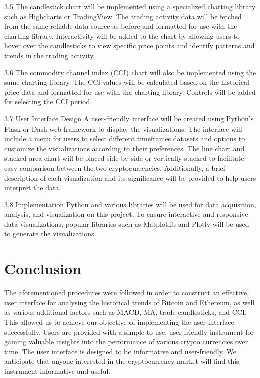 \documentclass[10pt,twocolumn,a4paper]{article}
\begin{document}
3.5 The candlestick chart will be implemented using a specialized charting library such as Highcharts or TradingView. The trading activity data will be fetched from the same reliable data source as before and formatted for use with the charting library. Interactivity will be added to the chart by allowing users to hover over the candlesticks to view specific price points and identify patterns and trends in the trading activity.

3.6 The commodity channel index (CCI) chart will also be implemented using the same charting library. The CCI values will be calculated based on the historical price data and formatted for use with the charting library. Controls will be added for selecting the CCI period.

3.7 User Interface Design
A user-friendly interface will be created using Python's Flask or Dash web framework to display the visualizations. The interface will include a menu for users to select different timeframes datasets and options to customize the visualizations according to their preferences. The line chart and stacked area chart will be placed side-by-side or vertically stacked to facilitate easy comparison between the two cryptocurrencies. Additionally, a brief description of each visualization and its significance will be provided to help users interpret the data.

3.8 Implementation
Python and various libraries will be used for data acquisition, analysis, and visualization on this project. To ensure interactive and responsive data visualizations, popular libraries such as Matplotlib and Plotly will be used to generate the visualizations.


\section{Conclusion}

The aforementioned procedures were followed in order to construct an effective user interface for analysing the historical trends of Bitcoin and Ethereum, as well as various additional factors such as MACD, MA, trade candlesticks, and CCI. This allowed us to achieve our objective of implementing the user interface successfully. Users are provided with a simple-to-use, user-friendly instrument for gaining valuable insights into the performance of various crypto currencies over time. The user interface is designed to be informative and user-friendly. We anticipate that anyone interested in the cryptocurrency market will find this instrument informative and useful.

{\small


}
\end{document}
